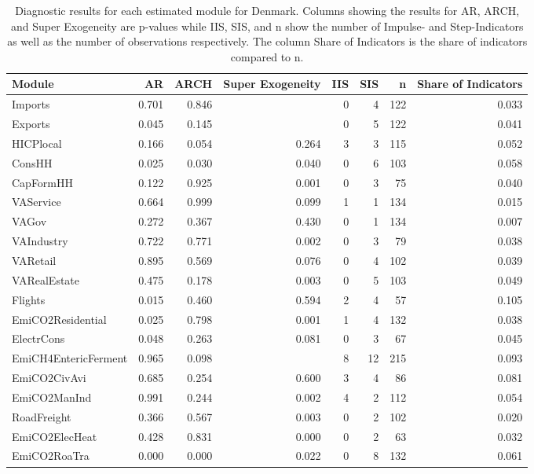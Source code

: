 \begin{table}
\centering
\caption{\label{tab:DK_diagnostics}Diagnostic results for each estimated module for Denmark. Columns showing the results for AR, ARCH, and Super Exogeneity are p-values while IIS, SIS, and n show the number of Impulse- and Step-Indicators as well as the number of observations respectively. The column Share of Indicators is the share of indicators compared to n.}
\centering
\begin{tabular}[t]{lrrrrrrr}
\toprule
Module & AR & ARCH & Super Exogeneity & IIS & SIS & n & Share of Indicators\\
\midrule
Imports & 0.701 & 0.846 &  & 0 & 4 & 122 & 0.033\\
Exports & 0.045 & 0.145 &  & 0 & 5 & 122 & 0.041\\
HICPlocal & 0.166 & 0.054 & 0.264 & 3 & 3 & 115 & 0.052\\
ConsHH & 0.025 & 0.030 & 0.040 & 0 & 6 & 103 & 0.058\\
CapFormHH & 0.122 & 0.925 & 0.001 & 0 & 3 & 75 & 0.040\\
\addlinespace
VAService & 0.664 & 0.999 & 0.099 & 1 & 1 & 134 & 0.015\\
VAGov & 0.272 & 0.367 & 0.430 & 0 & 1 & 134 & 0.007\\
VAIndustry & 0.722 & 0.771 & 0.002 & 0 & 3 & 79 & 0.038\\
VARetail & 0.895 & 0.569 & 0.076 & 0 & 4 & 102 & 0.039\\
VARealEstate & 0.475 & 0.178 & 0.003 & 0 & 5 & 103 & 0.049\\
\addlinespace
Flights & 0.015 & 0.460 & 0.594 & 2 & 4 & 57 & 0.105\\
EmiCO2Residential & 0.025 & 0.798 & 0.001 & 1 & 4 & 132 & 0.038\\
ElectrCons & 0.048 & 0.263 & 0.081 & 0 & 3 & 67 & 0.045\\
EmiCH4EntericFerment & 0.965 & 0.098 &  & 8 & 12 & 215 & 0.093\\
EmiCO2CivAvi & 0.685 & 0.254 & 0.600 & 3 & 4 & 86 & 0.081\\
\addlinespace
EmiCO2ManInd & 0.991 & 0.244 & 0.002 & 4 & 2 & 112 & 0.054\\
RoadFreight & 0.366 & 0.567 & 0.003 & 0 & 2 & 102 & 0.020\\
EmiCO2ElecHeat & 0.428 & 0.831 & 0.000 & 0 & 2 & 63 & 0.032\\
EmiCO2RoaTra & 0.000 & 0.000 & 0.022 & 0 & 8 & 132 & 0.061\\
\bottomrule
\end{tabular}
\end{table}

